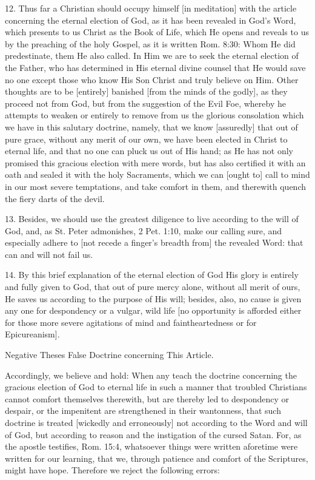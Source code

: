 12. Thus far a Christian should occupy himself [in meditation] with the article concerning the eternal election of God, as it has been revealed in God's Word, which presents to us Christ as the Book of Life, which He opens and reveals to us by the preaching of the holy Gospel, as it is written Rom. 8:30: Whom He did predestinate, them He also called. In Him we are to seek the eternal election of the Father, who has determined in His eternal divine counsel that He would save no one except those who know His Son Christ and truly believe on Him. Other thoughts are to be [entirely] banished [from the minds of the godly], as they proceed not from God, but from the suggestion of the Evil Foe, whereby he attempts to weaken or entirely to remove from us the glorious consolation which we have in this salutary doctrine, namely, that we know [assuredly] that out of pure grace, without any merit of our own, we have been elected in Christ to eternal life, and that no one can pluck us out of His hand; as He has not only promised this gracious election with mere words, but has also certified it with an oath and sealed it with the holy Sacraments, which we can [ought to] call to mind in our most severe temptations, and take comfort in them, and therewith quench the fiery darts of the devil.

13. Besides, we should use the greatest diligence to live according to the will of God, and, as St. Peter admonishes, 2 Pet. 1:10, make our calling sure, and especially adhere to [not recede a finger's breadth from] the revealed Word: that can and will not fail us.

14. By this brief explanation of the eternal election of God His glory is entirely and fully given to God, that out of pure mercy alone, without all merit of ours, He saves us according to the purpose of His will; besides, also, no cause is given any one for despondency or a vulgar, wild life [no opportunity is afforded either for those more severe agitations of mind and faintheartedness or for Epicureanism].

Negative Theses
False Doctrine concerning This Article.

Accordingly, we believe and hold: When any teach the doctrine concerning the gracious election of God to eternal life in such a manner that troubled Christians cannot comfort themselves therewith, but are thereby led to despondency or despair, or the impenitent are strengthened in their wantonness, that such doctrine is treated [wickedly and erroneously] not according to the Word and will of God, but according to reason and the instigation of the cursed Satan. For, as the apostle testifies, Rom. 15:4, whatsoever things were written aforetime were written for our learning, that we, through patience and comfort of the Scriptures, might have hope. Therefore we reject the following errors:

